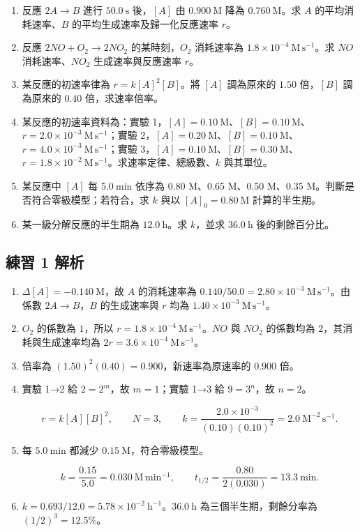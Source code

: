 \documentclass[11pt,a4paper]{article}
\providecommand{\tightlist}{%
  \setlength{\itemsep}{0pt}\setlength{\parskip}{0pt}}
\begin{document}
\begin{enumerate}
\def\labelenumi{\arabic{enumi}.}
\tightlist
\item
  反應 \(2A\rightarrow B\) 進行 \(50.0\ \mathrm s\) 後，\([A]\) 由 \(0.900\ \mathrm M\) 降為 \(0.760\ \mathrm M\)。求 \(A\) 的平均消耗速率、\(B\) 的平均生成速率及歸一化反應速率 \(r\)。
\item
  反應 \(2NO+O_2\rightarrow2NO_2\) 的某時刻，\(O_2\) 消耗速率為 \(1.8\times10^{-4}\ \mathrm{M\,s^{-1}}\)。求 \(NO\) 消耗速率、\(NO_2\) 生成速率與反應速率 \(r\)。
\item
  某反應的初速率律為 \(r=k[A]^2[B]\)。將 \([A]\) 調為原來的 \(1.50\) 倍，\([B]\) 調為原來的 \(0.40\) 倍，求速率倍率。
\item
  某反應的初速率資料為：實驗 1，\([A]=0.10\ \mathrm M\)、\([B]=0.10\ \mathrm M\)、\(r=2.0\times10^{-3}\ \mathrm{M\,s^{-1}}\)；實驗 2，\([A]=0.20\ \mathrm M\)、\([B]=0.10\ \mathrm M\)、\(r=4.0\times10^{-3}\ \mathrm{M\,s^{-1}}\)；實驗 3，\([A]=0.10\ \mathrm M\)、\([B]=0.30\ \mathrm M\)、\(r=1.8\times10^{-2}\ \mathrm{M\,s^{-1}}\)。求速率定律、總級數、\(k\) 與其單位。
\item
  某反應中 \([A]\) 每 \(5.0\ \mathrm{min}\) 依序為 \(0.80\) M、\(0.65\) M、\(0.50\) M、\(0.35\) M。判斷是否符合零級模型；若符合，求 \(k\) 與以 \([A]_0=0.80\ \mathrm M\) 計算的半生期。
\item
  某一級分解反應的半生期為 \(12.0\ \mathrm h\)。求 \(k\)，並求 \(36.0\ \mathrm h\) 後的剩餘百分比。
\end{enumerate}

\subsection{練習 1 解析}\label{ux7df4ux7fd2-1-ux89e3ux6790}

\begin{enumerate}
\def\labelenumi{\arabic{enumi}.}
\item
  \(\Delta[A]=-0.140\ \mathrm M\)，故 \(A\) 的消耗速率為 \(0.140/50.0=2.80\times10^{-3}\ \mathrm{M\,s^{-1}}\)。由係數 \(2A\rightarrow B\)，\(B\) 的生成速率與 \(r\) 均為 \(1.40\times10^{-3}\ \mathrm{M\,s^{-1}}\)。
\item
  \(O_2\) 的係數為 \(1\)，所以 \(r=1.8\times10^{-4}\ \mathrm{M\,s^{-1}}\)。\(NO\) 與 \(NO_2\) 的係數均為 \(2\)，其消耗與生成速率均為 \(2r=3.6\times10^{-4}\ \mathrm{M\,s^{-1}}\)。
\item
  倍率為 \((1.50)^2(0.40)=0.900\)，新速率為原速率的 \(0.900\) 倍。
\item
  實驗 1→2 給 \(2=2^m\)，故 \(m=1\)；實驗 1→3 給 \(9=3^n\)，故 \(n=2\)。

  \[
  r=k[A][B]^2,
  \qquad N=3,
  \qquad
  k=\frac{2.0\times10^{-3}}{(0.10)(0.10)^2}
  =2.0\ \mathrm{M^{-2}\,s^{-1}}.
  \]
\item
  每 \(5.0\ \mathrm{min}\) 都減少 \(0.15\ \mathrm M\)，符合零級模型。

  \[
  k=\frac{0.15}{5.0}=0.030\ \mathrm{M\,min^{-1}},
  \qquad
  t_{1/2}=\frac{0.80}{2(0.030)}=13.3\ \mathrm{min}.
  \]
\item
  \(k=0.693/12.0=5.78\times10^{-2}\ \mathrm{h^{-1}}\)。\(36.0\ \mathrm h\) 為三個半生期，剩餘分率為 \((1/2)^3=12.5\%\)。
\end{enumerate}
\end{document}
